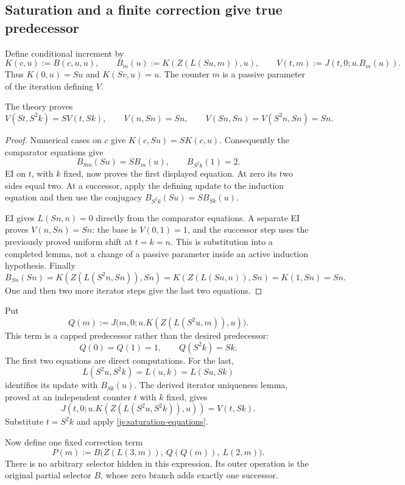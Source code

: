 \subsection{Saturation and a finite correction give true predecessor}

Define conditional increment by
\[
 K(c,u):=B(c,u,u),\qquad
 B_m(u):=K(Z(L(Su,m)),u),\qquad
 V(t,m):=J(t,0;u.B_m(u)).
\]
Thus $K(0,u)=Su$ and $K(Sv,u)=u$.  The counter $m$ is a passive
parameter of the iteration defining $V$.

\begin{lemma}\label{js:saturation}
The theory proves
\[
 V(St,S^2k)=S V(t,Sk),\qquad
 V(n,Sn)=Sn,\qquad
 V(Sn,Sn)=V(S^2n,Sn)=Sn.
 \tag{Saturation}\label{js:saturation-equations}
\]
\end{lemma}
\begin{proof}
Numerical cases on $c$ give $K(c,Su)=S K(c,u)$.  Consequently
the comparator equations give
\[
 B_{Sm}(Su)=S B_m(u),\qquad B_{S^2k}(1)=2.
\]
EI on $t$, with $k$ fixed, now proves the first displayed equation.
At zero its two sides equal two.  At a successor, apply the defining
update to the induction equation and then use the conjugacy
$B_{S^2k}(Su)=S B_{Sk}(u)$.

EI gives $L(Sn,n)=0$ directly from the comparator equations.
A separate EI proves $V(n,Sn)=Sn$: the base is $V(0,1)=1$,
and the successor step uses the previously proved uniform shift at
$t=k=n$.  This is substitution into a completed lemma, not a change
of a passive parameter inside an active induction hypothesis.
Finally
\[
 B_{Sn}(Sn)=K(Z(L(S^2n,Sn)),Sn)
           =K(Z(L(Sn,n)),Sn)=K(1,Sn)=Sn.
\]
One and then two more iterator steps give the last two equations.
\end{proof}

Put
\[
 Q(m):=J\bigl(m,0;u.K(Z(L(S^2u,m)),u)\bigr).
\]
This term is a capped predecessor rather than the desired predecessor:
\[
 Q(0)=Q(1)=1,\qquad Q(S^2k)=Sk.
 \tag{Capped predecessor}\label{js:capped}
\]
The first two equations are direct computations.  For the last,
\[
 L(S^2u,S^2k)=L(u,k)=L(Su,Sk)
\]
identifies its update with $B_{Sk}(u)$.  The derived iterator uniqueness
lemma, proved at an independent counter $t$ with $k$ fixed, gives
\[
 J(t,0;u.K(Z(L(S^2u,S^2k)),u))=V(t,Sk).
\]
Substitute $t=S^2k$ and apply \eqref{js:saturation-equations}.

Now define one fixed correction term
\[
 \boxed{\quad
 P(m):=B\bigl(Z(L(3,m)),\ Q(Q(m)),\ L(2,m)\bigr).
 \quad}\tag{Predecessor}\label{js:predecessor}
\]
There is no arbitrary selector hidden in this expression.  Its outer
operation is the original partial selector $B$, whose zero branch adds
exactly one successor.

